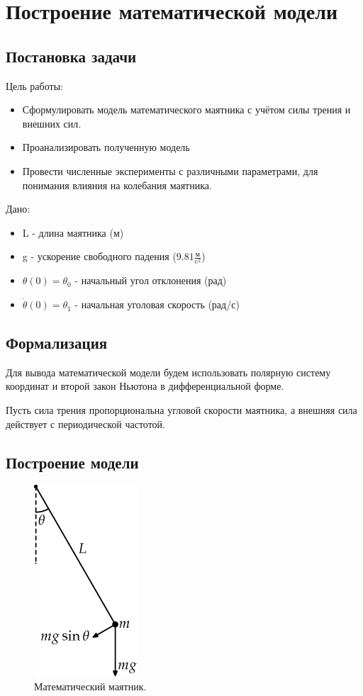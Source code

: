 \chapter{Построение математической модели}
\section{Постановка задачи}
Цель работы:
\begin{itemize}
	\item Сформулировать модель математического маятника с учётом силы трения и внешних сил.
	\item Проанализировать полученную модель
	\item Провести численные эксперименты с различными параметрами, для понимания влияния на колебания маятника.
\end{itemize}

Дано:
\begin{itemize}
	\item L - длина маятника (м)
	\item g - ускорение свободного падения ($9.81 \frac{\text{м}}{\text{c}^2}$)
	\item $\theta(0) = \theta_0$ - начальный угол отклонения (рад)
	\item $\dot{\theta}(0) = \theta_1$ - начальная уголовая скорость (рад/с)
\end{itemize}
\section{Формализация}
Для вывода математической модели будем использовать полярную систему координат и второй закон Ньютона в дифференциальной форме.

Пусть сила трения пропорциональна угловой скорости маятника, а внешняя сила 
действует с периодической частотой.

\section{Построение модели}
\begin{figure}[h]  %
	\centering
	\includegraphics[height=0.3\textwidth]{imgs/pendulum_model.png}  %
	\caption{Математический маятник.}  %
	\label{fig:pendulum}  %
\end{figure}

